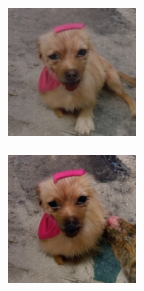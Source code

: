 \documentclass{article}
\begin{document}
\begin{figure}
\begin{subfigure}[b]{0.5\linewidth}
\begin{subfigure}[b]{0.242\linewidth}
        \end{subfigure}
        \hfill
    \end{subfigure}%
    \begin{subfigure}[b]{0.5\linewidth}
        \begin{subfigure}[b]{0.242\linewidth}
        \includegraphics[width=\linewidth]{figures/imagenet128/solver_samples/imagenet128_fm_ot_355_05.png}
        \end{subfigure}
        \begin{subfigure}[b]{0.242\linewidth}
        \includegraphics[width=\linewidth]{figures/imagenet128/solver_samples/imagenet128_fm_ot_355_10.png}

\end{subfigure}
\end{subfigure}
\end{figure}
\end{document}
